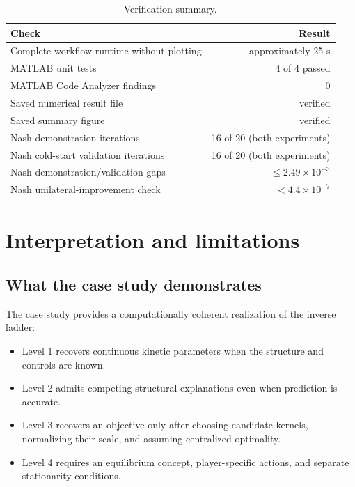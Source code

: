 \documentclass[11pt,a4paper]{article}
\begin{document}
\begin{table}[H]
\centering
\caption{Verification summary.}
\label{tab:verification}
\begin{tabular}{lr}
\toprule
Check & Result\\
\midrule
Complete workflow runtime without plotting & approximately 25 s\\
MATLAB unit tests & 4 of 4 passed\\
MATLAB Code Analyzer findings & 0\\
Saved numerical result file & verified\\
Saved summary figure & verified\\
Nash demonstration iterations & 16 of 20 (both experiments)\\
Nash cold-start validation iterations & 16 of 20 (both experiments)\\
Nash demonstration/validation gaps & \(\le 2.49\times10^{-3}\)\\
Nash unilateral-improvement check & \(<4.4\times10^{-7}\)\\
\bottomrule
\end{tabular}
\end{table}

\clearpage
\section[Interpretation and limitations]{\hspace{0.5em}Interpretation and limitations}

\subsection{What the case study demonstrates}

The case study provides a computationally coherent realization of the inverse
ladder:
\begin{itemize}
  \item Level 1 recovers continuous kinetic parameters when the structure and
        controls are known.
  \item Level 2 admits competing structural explanations even when prediction
        is accurate.
  \item Level 3 recovers an objective only after choosing candidate kernels,
        normalizing their scale, and assuming centralized optimality.
  \item Level 4 requires an equilibrium concept, player-specific actions, and
        separate stationarity conditions.
\end{itemize}
\end{document}
